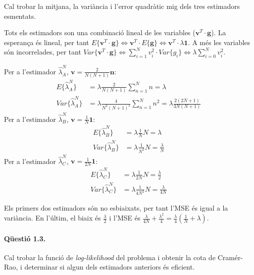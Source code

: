 \documentclass[catalan]{scrartcl}
\begin{document}
Cal trobar la mitjana, la variància i l'error quadràtic mig dels
tres estimadors esmentats.

Tots els estimadors son una combinació lineal de les variables
($\mathbf{v}^T \cdot \mathbf{g}$). La esperança és lineal, per tant
$E\{ \mathbf{v}^T \cdot \mathbf{g} \} \Leftrightarrow
\mathbf{v}^T \cdot E\{\mathbf{g}\} \Leftrightarrow
\mathbf{v}^T \cdot \lambda\mathbf{1}$.
A més les variables són incorrelades, per tant
$Var\{ \mathbf{v}^T \cdot \mathbf{g} \}
\Leftrightarrow \sum_{i=1}^N v_i^2 \cdot Var\{g_i\} \Leftrightarrow
\lambda \sum_{i=0}^N v_i^2$.

Per a l'estimador $\hat{\lambda}_A^N$, $\mathbf{v} =
\frac{2}{N(N+1)} \mathbf{n}$:
%
\begin{align}
  E\{\hat{\lambda}_A^N\} &= \lambda \frac{2}{N(N+1)} \sum_{n=1}^N n = \lambda
\\
  Var\{\hat{\lambda}_A^N\} &= \lambda \frac{4}{N^2(N+1)^2}
    \sum_{n=1}^N n^2
    = \lambda \frac{2(2N+1)}{3N(N+1)}
\end{align}
%
Per a l'estimador $\hat{\lambda}_B^N$, $\mathbf{v} =
\frac{1}{N} \mathbf{1}$:
%
\begin{align}
  E\{\hat{\lambda}_B^N\} &= \lambda \frac{1}{N} N = \lambda
\\
  Var\{\hat{\lambda}_B^N\} &= \lambda \frac{1}{N^2} N
    = \frac{\lambda}{N}
\end{align}
%
Per a l'estimador $\hat{\lambda}_C^N$, $\mathbf{v} =
\frac{1}{2N} \mathbf{1}$:
%
\begin{align}
  E\{\hat{\lambda}_C^N\} &= \lambda \frac{1}{2N} N = \frac{\lambda}{2}
\\
  Var\{\hat{\lambda}_C^N\} &= \lambda \frac{1}{4N^2} N
    = \frac{\lambda}{4N}
\end{align}

Els primers dos estimadors són no esbiaixats, per tant l'MSE és igual a la
variància. En l'últim, el biaix és $\frac{\lambda}{2}$ i l'MSE és
$\frac{\lambda}{4N} + \frac{\lambda^2}{4} = \frac{\lambda}{4} (\frac{1}{N} + \lambda)$.

\paragraph{Qüestió 1.3.}

Cal trobar la funció de \emph{log-likelihood} del problema i obtenir la cota de
Cramér-Rao, i determinar si algun dels estimadors anteriors és eficient.
\end{document}
